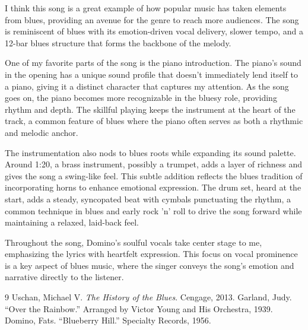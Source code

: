 \documentclass[12pt]{article}
\begin{document}
I think this song is a great example of how popular music has taken elements from blues, providing an avenue for the genre to reach more audiences. The song is reminiscent of blues with its emotion-driven vocal delivery, slower tempo, and a 12-bar blues structure that forms the backbone of the melody.

One of my favorite parts of the song is the piano introduction. The piano's sound in the opening has a unique sound profile that doesn’t immediately lend itself to a piano, giving it a distinct character that captures my attention. As the song goes on, the piano becomes more recognizable in the bluesy role, providing rhythm and depth. The skillful playing keeps the instrument at the heart of the track, a common feature of blues where the piano often serves as both a rhythmic and melodic anchor.

The instrumentation also nods to blues roots while expanding its sound palette. Around 1:20, a brass instrument, possibly a trumpet, adds a layer of richness and gives the song a swing-like feel. This subtle addition reflects the blues tradition of incorporating horns to enhance emotional expression. The drum set, heard at the start, adds a steady, syncopated beat with cymbals punctuating the rhythm, a common technique in blues and early rock 'n' roll to drive the song forward while maintaining a relaxed, laid-back feel.

Throughout the song, Domino’s soulful vocals take center stage to me, emphasizing the lyrics with heartfelt expression. This focus on vocal prominence is a key aspect of blues music, where the singer conveys the song’s emotion and narrative directly to the listener.

\newpage

\begin{thebibliography}{9}
Uschan, Michael V. \textit{The History of the Blues}. Cengage, 2013.
 Garland, Judy. ``Over the Rainbow.'' Arranged by Victor Young and His Orchestra, 1939.
 Domino, Fats. ``Blueberry Hill.'' Specialty Records, 1956.
\end{thebibliography}
\end{document}
